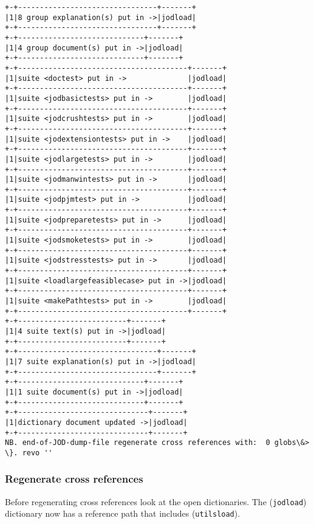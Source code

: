 \documentclass[11pt,letter,landscape]{article}
\begin{document}
\begin{Verbatim}[commandchars=\\\{\}]
+-+--------------------------------+-------+
|1|8 group explanation(s) put in ->|jodload|
+-+--------------------------------+-------+
+-+-----------------------------+-------+
|1|4 group document(s) put in ->|jodload|
+-+-----------------------------+-------+
+-+---------------------------------------+-------+
|1|suite <doctest> put in ->              |jodload|
+-+---------------------------------------+-------+
|1|suite <jodbasictests> put in ->        |jodload|
+-+---------------------------------------+-------+
|1|suite <jodcrushtests> put in ->        |jodload|
+-+---------------------------------------+-------+
|1|suite <jodextensiontests> put in ->    |jodload|
+-+---------------------------------------+-------+
|1|suite <jodlargetests> put in ->        |jodload|
+-+---------------------------------------+-------+
|1|suite <jodmanwintests> put in ->       |jodload|
+-+---------------------------------------+-------+
|1|suite <jodpjmtest> put in ->           |jodload|
+-+---------------------------------------+-------+
|1|suite <jodpreparetests> put in ->      |jodload|
+-+---------------------------------------+-------+
|1|suite <jodsmoketests> put in ->        |jodload|
+-+---------------------------------------+-------+
|1|suite <jodstresstests> put in ->       |jodload|
+-+---------------------------------------+-------+
|1|suite <loadlargefeasiblecase> put in ->|jodload|
+-+---------------------------------------+-------+
|1|suite <makePathtests> put in ->        |jodload|
+-+---------------------------------------+-------+
+-+-------------------------+-------+
|1|4 suite text(s) put in ->|jodload|
+-+-------------------------+-------+
+-+--------------------------------+-------+
|1|7 suite explanation(s) put in ->|jodload|
+-+--------------------------------+-------+
+-+-----------------------------+-------+
|1|1 suite document(s) put in ->|jodload|
+-+-----------------------------+-------+
+-+------------------------------+-------+
|1|dictionary document updated ->|jodload|
+-+------------------------------+-------+
NB. end-of-JOD-dump-file regenerate cross references with:  0 globs\&> \}. revo '' 

    \end{Verbatim}

    \subsubsection{Regenerate cross
references}\label{regenerate-cross-references}

Before regenerating cross references look at the open dictionaries. The
(\texttt{jodload}) dictionary now has a reference path that includes
(\texttt{utilsload}).
\end{document}
